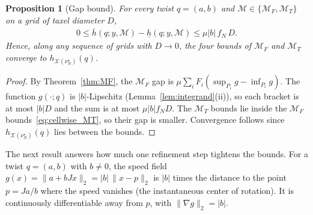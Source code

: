 \documentclass[11pt,a4paper]{article}
\theoremstyle{plain}
\newtheorem{proposition}[theorem]{Proposition}
\newcommand{\X}{\mathcal X}
\begin{document}
\begin{proposition}[Gap bound]
\label{prop:taxel_resolution_MT}
    For every twist $q=(a,b)$ and $\mathcal M\in\{\mathcal M_F,\mathcal M_T\}$ on a grid of taxel diameter $D$,
    \begin{align}
        \boxed{0\le\overline h(q;y,\mathcal M)-\underline h(q;y,\mathcal M)\le\mu|b|\,f_N\,D.}
    \end{align}
    Hence, along any sequence of grids with $D\to0$, the four bounds of $\mathcal M_F$ and $\mathcal M_T$ converge to $h_{\X(\nu_N^\star)}(q)$.
\end{proposition}
\begin{proof}
    By Theorem~\ref{thm:MF}, the $\mathcal M_F$ gap is $\mu\sum_iF_i\left(\sup_{P_i}g-\inf_{P_i}g\right)$. The function $g(\cdot;q)$ is $|b|$-Lipschitz (Lemma~\ref{lem:integrand}(ii)), so each bracket is at
    most $|b|D$ and the sum is at most $\mu|b|f_ND$. The $\mathcal M_T$ bounds lie inside the $\mathcal M_F$ bounds~\eqref{eq:cellwise_MT}, so their gap is smaller. Convergence follows since
    $h_{\X(\nu_N^\star)}(q)$ lies between the bounds.
\end{proof}
The next result answers how much one refinement step tightens the bounds. For a twist $q=(a,b)$ with $b\neq0$, the speed field $g(x)=\|a+bJx\|_2=|b|\,\|x-p\|_2$ is $|b|$ times the distance to the point
$p=Ja/b$ where the speed vanishes (the instantaneous center of rotation). It is continuously differentiable away from $p$, with $\|\nabla g\|_2=|b|$.
\end{document}
